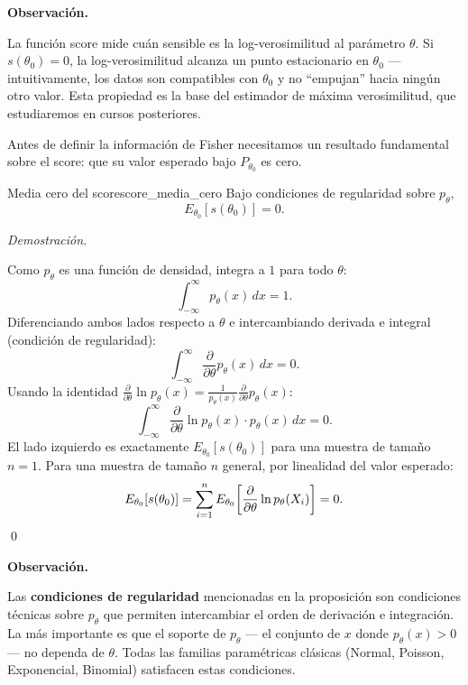 \documentclass[12pt, a4paper]{book}
\newenvironment{observacion}{%
    \par\medskip\noindent\textbf{\color{azul}Observaci\'{o}n.}\enspace\itshape
}{\par\medskip}
\renewenvironment{proof}{%
    \par\medskip\noindent\textit{Demostraci\'{o}n.}\enspace
}{\qed\par\medskip}
\numberwithin{equation}{chapter}
\begin{document}
\begin{observacion}
	La funci\'{o}n score mide cu\'{a}n sensible es la
	log-verosimilitud al par\'{a}metro $\theta$. Si
	$s(\theta_0) = 0$, la log-verosimilitud alcanza un
	punto estacionario en $\theta_0$ --- intuitivamente,
	los datos son compatibles con $\theta_0$ y no
	``empujan'' hacia ning\'{u}n otro valor. Esta
	propiedad es la base del estimador de m\'{a}xima
	verosimilitud, que estudiaremos en cursos posteriores.
\end{observacion}

Antes de definir la informaci\'{o}n de Fisher necesitamos
un resultado fundamental sobre el score: que su valor
esperado bajo $P_{\theta_0}$ es cero.

\begin{proposicion}{Media cero del score}{score_media_cero}
	Bajo condiciones de regularidad sobre $p_\theta$,
	\[
	E_{\theta_0}[s(\theta_0)] = 0.
	\]
\end{proposicion}

\begin{proof}
	Como $p_\theta$ es una funci\'{o}n de densidad,
	integra a $1$ para todo $\theta$:
	\[
	\int_{-\infty}^{\infty} p_\theta(x)\,dx = 1.
	\]
	Diferenciando ambos lados respecto a $\theta$ e
	intercambiando derivada e integral (condici\'{o}n de
	regularidad):
	\[
	\int_{-\infty}^{\infty}
	\frac{\partial}{\partial\theta}
	p_\theta(x)\,dx = 0.
	\]
	Usando la identidad
	$\frac{\partial}{\partial\theta}\ln p_\theta(x)
	= \frac{1}{p_\theta(x)}
	\frac{\partial}{\partial\theta}p_\theta(x)$:
	\[
	\int_{-\infty}^{\infty}
	\frac{\partial}{\partial\theta}\ln p_\theta(x)
	\cdot p_\theta(x)\,dx = 0.
	\]
	El lado izquierdo es exactamente
	$E_{\theta_0}[s(\theta_0)]$ para una muestra de
	tama\~{n}o $n=1$. Para una muestra de tama\~{n}o
	$n$ general, por linealidad del valor esperado:
	\[
	E_{\theta_0}[s(\theta_0)]
	= \sum_{i=1}^n E_{\theta_0}\!\left[
	\frac{\partial}{\partial\theta}
	\ln p_\theta(X_i)\right] = 0. \qedhere
	\]
\end{proof}

\begin{observacion}
	Las \textbf{condiciones de regularidad} mencionadas en
	la proposici\'{o}n son condiciones t\'{e}cnicas sobre
	$p_\theta$ que permiten intercambiar el orden de
	derivaci\'{o}n e integraci\'{o}n. La m\'{a}s
	importante es que el soporte de $p_\theta$ --- el
	conjunto de $x$ donde $p_\theta(x) > 0$ --- no
	dependa de $\theta$. Todas las familias param\'{e}tricas
	cl\'{a}sicas (Normal, Poisson, Exponencial, Binomial)
	satisfacen estas condiciones.
\end{observacion}
\end{document}
